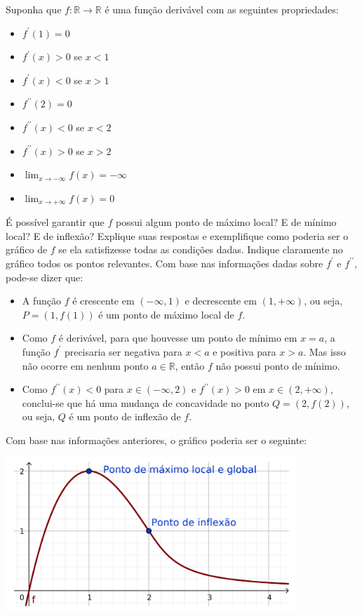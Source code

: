 \documentclass[12pt,a4paper]{article}
\newcommand*\R{\mathbb{R}}
\begin{document}
\begin{ExerciseList}
\Exercise[title={2,0}] Suponha que $f:\R \to \R$ é uma função derivável com as seguintes propriedades:
\begin{multicols}{3}
\begin{itemize}
\item $f^\prime(1) = 0$
\item $f^\prime(x) > 0$ se $x < 1$
\item $f^\prime(x) < 0$ se $x > 1$
\item $f^{\prime\prime}(2) = 0$
\item $f^{\prime\prime}(x) < 0$ se $x < 2$
\item $f^{\prime\prime}(x) > 0$ se $x > 2$
\item $\displaystyle\lim_{x \to -\infty} f(x) = -\infty$
\item $\displaystyle\lim_{x \to +\infty} f(x) = 0$
\end{itemize}
\end{multicols}
É possível garantir que $f$ possui algum ponto de máximo local? E de mínimo local? E de inflexão? Explique suas respostas e exemplifique como poderia ser o gráfico de $f$ se ela satisfizesse todas as condições dadas. Indique claramente no gráfico todos os pontos relevantes.
\Answer Com base nas informações dadas sobre $f^\prime$ e $f^{\prime\prime}$, pode-se dizer que:
\begin{itemize}
\item A função $f$ é crescente em $(-\infty, 1)$ e decrescente em $(1, +\infty)$, ou seja, $P = (1, f(1))$ é um ponto de máximo local de $f$.
\item Como $f$ é derivável, para que houvesse um ponto de mínimo em $x = a$, a função $f^\prime$ precisaria ser negativa para $x < a$ e positiva para $x>a$. Mas isso não ocorre em nenhum ponto $a \in \R$, então $f$ não possui ponto de mínimo.
\item Como $f^{\prime\prime}(x) < 0$ para $x \in (-\infty, 2)$ e $f^{\prime\prime} (x)> 0$ em $x \in (2, +\infty)$, conclui-se que há uma mudança de concavidade no ponto $Q = (2, f(2))$, ou seja, $Q$ é um ponto de inflexão de $f$.
\end{itemize}
Com base nas informações anteriores, o gráfico poderia ser o seguinte:
\begin{center}
\includegraphics[width=11.0cm]{img/prova-3-tads-graph}
\end{center}


\end{ExerciseList}
\end{document}
